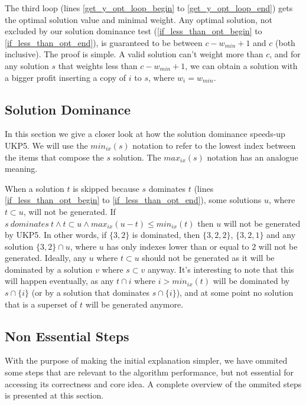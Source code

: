 \documentclass[runningheads,a4paper]{llncs}
\begin{document}
The third loop (lines \ref{get_y_opt_loop_begin} to \ref{get_y_opt_loop_end}) gets the optimal solution value and minimal weight. Any optimal solution, not excluded by our solution dominance test (\ref{if_less_than_opt_begin} to \ref{if_less_than_opt_end}), is guaranteed to be between \(c - w_{min} + 1\) and \(c\) (both inclusive). The proof is simple. A valid solution can't weight more than \(c\), and for any solution \(s\) that weights less than \(c - w_{min} + 1\), we can obtain a solution with a bigger profit inserting a copy of \(i\) to \(s\), where \(w_i = w_{min}\).

\subsection{Solution Dominance}

In this section we give a closer look at how the solution dominance speeds-up UKP5. We will use the \(min_{ix}(s)\) notation to refer to the lowest index between the items that compose the \(s\) solution. The \(max_{ix}(s)\) notation has an analogue meaning.

When a solution \(t\) is skipped because \(s\) dominates \(t\) (lines \ref{if_less_than_opt_begin} to \ref{if_less_than_opt_end}), some solutions \(u\), where \(t \subset u\), will not be generated. If \(s~dominates~t \land t \subset u \land max_{ix}(u - t) \leq min_{ix}(t)\) then \(u\) will not be generated by UKP5. In other words, if \(\{3, 2\}\) is dominated, then \(\{3, 2, 2\}\), \(\{3, 2, 1\}\) and any solution \(\{3, 2\} \cap u\), where \(u\) has only indexes lower than or equal to \(2\) will not be generated. Ideally, any \(u\) where \(t \subset u\) should not be generated as it will be dominated by a solution \(v\) where \(s \subset v\) anyway. It's interesting to note that this will happen eventually, as any \(t \cap {i}\) where \(i > min_{ix}(t)\) will be dominated by \(s \cap \{i\}\) (or by a solution that dominates \(s \cap \{i\}\)), and at some point no solution that is a superset of \(t\) will be generated anymore.

\subsection{Non Essential Steps}

With the purpose of making the initial explanation simpler, we have ommited some steps that are relevant to the algorithm performance, but not essential for accessing its correctness and core idea. A complete overview of the ommited steps is presented at this section.
\end{document}
